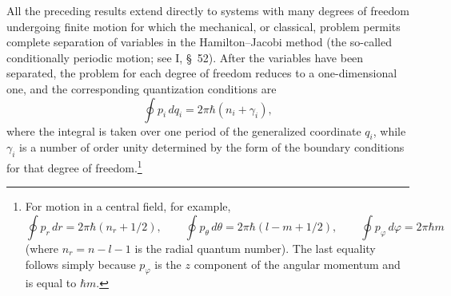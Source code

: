 All the preceding results extend directly to systems with many degrees of
freedom undergoing finite motion for which the mechanical, or classical,
problem permits complete separation of variables in the Hamilton--Jacobi
method (the so-called conditionally periodic motion; see I, §~52).  After the
variables have been separated, the problem for each degree of freedom reduces
to a one-dimensional one, and the corresponding quantization conditions are
\begin{equation}
  \oint p_i\,dq_i=2\pi\hbar(n_i+\gamma_i),
  \tag{48.6}
\end{equation}
where the integral is taken over one period of the generalized coordinate
$q_i$, while $\gamma_i$ is a number of order unity determined by the form of
the boundary conditions for that degree of freedom.\footnote{For motion in a
central field, for example,
\[
  \oint p_r\,dr=2\pi\hbar(n_r+1/2),\qquad
  \oint p_\theta\,d\theta=2\pi\hbar(l-m+1/2),\qquad
  \oint p_\varphi\,d\varphi=2\pi\hbar m
\]
(where $n_r=n-l-1$ is the radial quantum number).  The last equality follows
simply because $p_\varphi$ is the $z$ component of the angular momentum and is
equal to $\hbar m$.}
